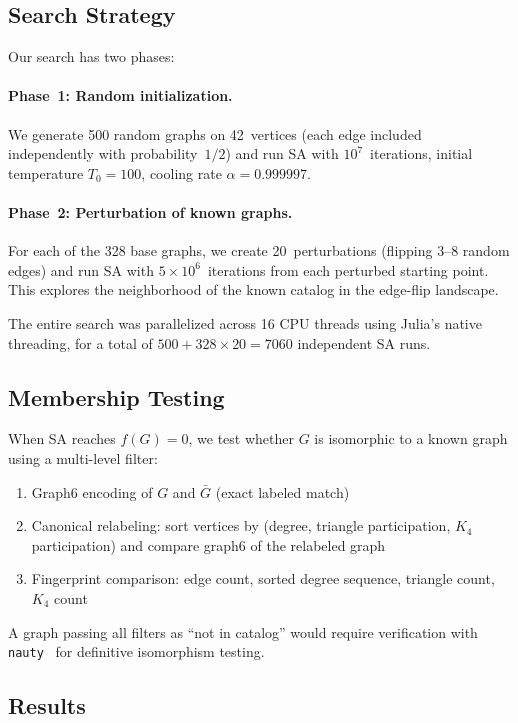 \documentclass[11pt,a4paper]{article}
\theoremstyle{definition}
\theoremstyle{remark}
\begin{document}
\subsection{Search Strategy}

Our search has two phases:

\paragraph{Phase~1: Random initialization.}
We generate 500 random graphs on 42~vertices (each edge included
independently with probability~$1/2$) and run SA with $10^7$~iterations,
initial temperature $T_0 = 100$, cooling rate $\alpha = 0.999997$.

\paragraph{Phase~2: Perturbation of known graphs.}
For each of the 328 base graphs, we create 20~perturbations
(flipping 3--8 random edges) and run SA with $5 \times 10^6$~iterations
from each perturbed starting point.  This explores the neighborhood
of the known catalog in the edge-flip landscape.

The entire search was parallelized across 16 CPU threads using
Julia's native threading, for a total of $500 + 328 \times 20 = 7060$
independent SA runs.

\subsection{Membership Testing}

When SA reaches $f(G) = 0$, we test whether $G$ is isomorphic
to a known graph using a multi-level filter:
\begin{enumerate}
  \item Graph6 encoding of $G$ and $\bar{G}$ (exact labeled match)
  \item Canonical relabeling: sort vertices by
    (degree, triangle participation, $K_4$ participation)
    and compare graph6 of the relabeled graph
  \item Fingerprint comparison: edge count, sorted degree sequence,
    triangle count, $K_4$ count
\end{enumerate}
A graph passing all filters as ``not in catalog'' would require
verification with \texttt{nauty}~\cite{McKay2014nauty} for
definitive isomorphism testing.

\subsection{Results}
\end{document}
